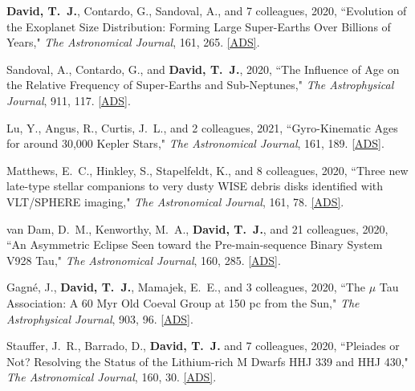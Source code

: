 \item {\bf {David}, T.~J.}, {Contardo}, G., {Sandoval}, A., and 7 colleagues, 2020, ``{Evolution of the Exoplanet Size Distribution: Forming Large Super-Earths Over Billions of Years}," \textit{The Astronomical Journal}, 161, 265. \href{https://ui.adsabs.harvard.edu/abs/2021AJ....161..265D/abstract}{[ADS]}.

\item {Sandoval}, A., {Contardo}, G., and {\bf {David}, T.~J.}, 2020, ``{The Influence of Age on the Relative Frequency of Super-Earths and Sub-Neptunes}," \textit{The Astrophysical Journal}, 911, 117. \href{https://ui.adsabs.harvard.edu/abs/2021ApJ...911..117S}{[ADS]}.

\item {Lu}, Y., {Angus}, R., {Curtis}, J.~L., and 2 colleagues, 2021, ``{Gyro-Kinematic Ages for around 30,000 Kepler Stars}," \textit{The Astronomical Journal}, 161, 189. \href{https://ui.adsabs.harvard.edu/abs/2021AJ....161..189L/abstract}{[ADS]}.

\item {Matthews}, E.~C., {Hinkley}, S., {Stapelfeldt}, K., and 8 colleagues, 2020, ``{Three new late-type stellar companions to very dusty WISE debris disks identified with VLT/SPHERE imaging}," \textit{The Astronomical Journal}, 161, 78. \href{https://ui.adsabs.harvard.edu/abs/2021AJ....161...78M/abstract}{[ADS]}.

\item {van Dam}, D.~M., {Kenworthy}, M.~A., {\bf {David}, T.~J.}, and 21 colleagues, 2020, ``{An Asymmetric Eclipse Seen toward the Pre-main-sequence Binary System V928 Tau}," \textit{The Astronomical Journal}, 160, 285. \href{https://ui.adsabs.harvard.edu/abs/2020AJ....160..285V/abstract}{[ADS]}.

\item {Gagn{\'e}}, J., {\bf {David}, T.~J.}, {Mamajek}, E.~E., and 3 colleagues, 2020, ``{The {\ensuremath{\mu}} Tau Association: A 60 Myr Old Coeval Group at 150 pc from the Sun}," \textit{The Astrophysical Journal}, 903, 96. \href{https://ui.adsabs.harvard.edu/abs/2020ApJ...903...96G/abstract}{[ADS]}.

\item {Stauffer}, J.~R., {Barrado}, D., {\bf {David}, T.~J.} and 7 colleagues, 2020, ``{Pleiades or Not? Resolving the Status of the Lithium-rich M Dwarfs HHJ 339 and HHJ 430}," \textit{The Astronomical Journal}, 160, 30. \href{https://ui.adsabs.harvard.edu/abs/2020AJ....160...30S/abstract}{[ADS]}.

